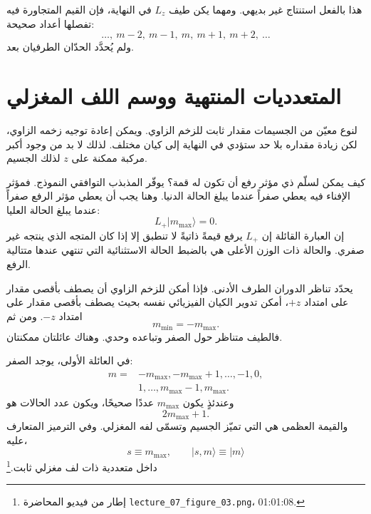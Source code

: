 هذا بالفعل استنتاج غير بديهي. ومهما يكن طيف \(L_z\) في النهاية، فإن القيم المتجاورة فيه تفصلها أعداد صحيحة:
\begin{equation}
\ldots,\ m-2,\ m-1,\ m,\ m+1,\ m+2,\ \ldots
\end{equation}
ولم يُحدَّد الحدّان الطرفيان بعد.

\section{المتعدديات المنتهية ووسم اللف المغزلي}

لنوع معيّن من الجسيمات مقدار ثابت للزخم الزاوي. ويمكن إعادة توجيه زخمه الزاوي، لكن زيادة مقداره بلا حد ستؤدي في النهاية إلى كيان مختلف. لذلك لا بد من وجود أكبر مركبة ممكنة على \(z\) لذلك الجسيم.

كيف يمكن لسلّم ذي مؤثر رفع أن تكون له قمة؟ يوفّر المذبذب التوافقي النموذج. فمؤثر الإفناء فيه يعطي صفراً عندما يبلغ الحالة الدنيا. وهنا يجب أن يعطي مؤثر الرفع صفراً عندما يبلغ الحالة العليا:
\begin{equation}
L_+\lvert m_{\max}\rangle=0.
\end{equation}
إن العبارة القائلة إن \(L_+\) يرفع قيمةً ذاتيةً لا تنطبق إلا إذا كان المتجه الذي ينتجه غير صفري. والحالة ذات الوزن الأعلى هي بالضبط الحالة الاستثنائية التي تنتهي عندها متتالية الرفع.

يحدّد تناظر الدوران الطرف الأدنى. فإذا أمكن للزخم الزاوي أن يصطف بأقصى مقدار على امتداد \(+z\)، أمكن تدوير الكيان الفيزيائي نفسه بحيث يصطف بأقصى مقدار على امتداد \(-z\). ومن ثم
\begin{equation}
m_{\min}=-m_{\max}.
\end{equation}
فالطيف متناظر حول الصفر وتباعده وحدي. وهناك عائلتان ممكنتان.

في العائلة الأولى، يوجد الصفر:
\begin{equation}
\begin{aligned}
m={}&-m_{\max},-m_{\max}+1,\ldots,-1,0,\\
&1,\ldots,m_{\max}-1,m_{\max}.
\end{aligned}
\end{equation}
وعندئذٍ يكون \(m_{\max}\) عددًا صحيحًا، ويكون عدد الحالات هو
\begin{equation}
2m_{\max}+1.
\end{equation}
والقيمة العظمى هي التي تميّز الجسيم وتسمّى لفه المغزلي. وفي الترميز المتعارف عليه،
\begin{equation}
s\equiv m_{\max},
\qquad
\lvert s,m\rangle\equiv\lvert m\rangle
\end{equation}
داخل متعددية ذات لف مغزلي ثابت.\footnote{\raggedright إطار من فيديو المحاضرة \nolinkurl{lecture_07_figure_03.png}، 01:01:08.\par}


